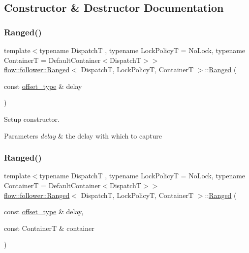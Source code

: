 \subsection{Constructor \& Destructor Documentation}
\mbox{\label{classflow_1_1follower_1_1_ranged_ae875d4520ce12d84cb9ebe10762d2c13}} 
\subsubsection{\texorpdfstring{Ranged()}{Ranged()}\hspace{0.1cm}{\footnotesize\ttfamily [1/2]}}
{\footnotesize\ttfamily template$<$typename DispatchT , typename Lock\+PolicyT  = No\+Lock, typename ContainerT  = Default\+Container$<$\+Dispatch\+T$>$$>$ \\
\hyperlink{classflow_1_1follower_1_1_ranged}{flow\+::follower\+::\+Ranged}$<$ DispatchT, Lock\+PolicyT, ContainerT $>$\+::\hyperlink{classflow_1_1follower_1_1_ranged}{Ranged} (\begin{DoxyParamCaption}\item[{const \hyperlink{classflow_1_1follower_1_1_ranged_ab5003d120aa00aaa2073625893228024}{offset\+\_\+type} \&}]{delay }\end{DoxyParamCaption})}



Setup constructor. 


\begin{DoxyParams}{Parameters}
{\em delay} & the delay with which to capture \\
\hline
\end{DoxyParams}
\mbox{\label{classflow_1_1follower_1_1_ranged_a4902671b662c881333e3c574f3793931}} 
\subsubsection{\texorpdfstring{Ranged()}{Ranged()}\hspace{0.1cm}{\footnotesize\ttfamily [2/2]}}
{\footnotesize\ttfamily template$<$typename DispatchT , typename Lock\+PolicyT  = No\+Lock, typename ContainerT  = Default\+Container$<$\+Dispatch\+T$>$$>$ \\
\hyperlink{classflow_1_1follower_1_1_ranged}{flow\+::follower\+::\+Ranged}$<$ DispatchT, Lock\+PolicyT, ContainerT $>$\+::\hyperlink{classflow_1_1follower_1_1_ranged}{Ranged} (\begin{DoxyParamCaption}\item[{const \hyperlink{classflow_1_1follower_1_1_ranged_ab5003d120aa00aaa2073625893228024}{offset\+\_\+type} \&}]{delay,  }\item[{const ContainerT \&}]{container }\end{DoxyParamCaption})}




